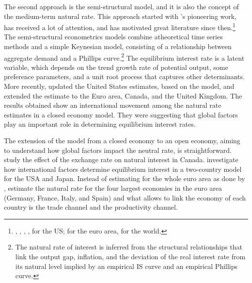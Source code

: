 \documentclass[12pt,oneside,a4paper]{article}
\begin{document}
The second approach is the semi-structural model, and it is also the concept of the medium-term natural rate. This approach started with \citet{LW:2003}’s pioneering work, has received a lot of attention, and has motivated great literature since then.\footnote{ 
\citet{Wu:2007}, \citet{Clark:2005}, \citet{Kiley:2015}, \citet{Juselius:2017}, for the US; \citet{Renne:2007} for the euro area, \citet{Wynne:2018} for the world.} The semi-structural econometrics models combine atheoretical time series methods and a simple Keynesian model, consisting of a relationship between aggregate demand and a Phillips curve.\footnote{The natural rate of interest  is inferred from the structural relationships that link the output gap, inflation, and the deviation of the real interest rate from its natural level implied by an empirical IS curve and an empirical Phillips curve.} The equilibrium interest rate is a latent variable, which depends on the trend growth rate of potential output, some preference parameters, and a unit root process that captures other determinants. More recently, \citet{HLW:2017} updated the United States estimates, based on the \citet{LW:2003} model, and extended the estimate to the Euro area, Canada, and the United Kingdom. The results obtained show an international movement among the natural rate estimates in a closed economy model. They were suggesting that global factors play an important role in determining equilibrium interest rates.

The extension of the \citet{LW:2003} model from a closed economy to an open economy, aiming to understand how global factors impact the neutral rate, is straightforward. \citet{Berger:2014} study the effect of the exchange rate on natural interest in Canada. \citet{Wynne:2018} investigate how international factors determine equilibrium interest in a two-country model for the USA and Japan. Instead of estimating for the whole euro area as done by \citet{Renne:2007}, \citet{Fries:2018} estimate the natural rate for the four largest economies in the euro area (Germany, France, Italy, and Spain) and what allows to link the economy of each country is the trade channel and the productivity channel.
\end{document}
